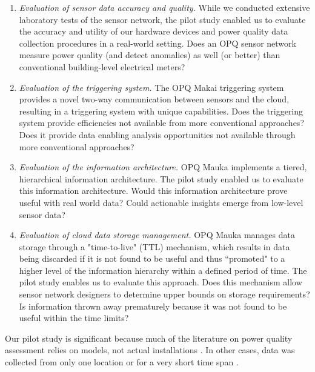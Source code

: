 \begin{enumerate}

\item {\em Evaluation of sensor data accuracy and quality.} While we conducted extensive laboratory tests of the sensor network, the pilot study enabled us to evaluate the accuracy and utility of our hardware devices and power quality data collection procedures in a real-world setting. Does an OPQ sensor network measure power quality (and detect anomalies) as well (or better) than conventional building-level electrical meters?

\item {\em Evaluation of the triggering system.} The OPQ Makai triggering system provides a novel two-way communication between sensors and the cloud, resulting in a triggering system with unique capabilities.  Does the triggering system provide efficiencies not available from more conventional approaches? Does it provide data enabling analysis opportunities not available through more conventional approaches?

\item {\em Evaluation of the information architecture.} OPQ Mauka implements a tiered, hierarchical information architecture.  The pilot study enabled us to evaluate this information architecture.  Would this information architecture prove useful with real world data? Could actionable insights emerge from low-level sensor data?

\item {\em Evaluation of cloud data storage management.} OPQ Mauka manages data storage through a "time-to-live" (TTL) mechanism, which results in data being discarded if it is not found to be useful and thus ``promoted" to a higher level of the information hierarchy within a defined period of time.  The pilot study enables us to evaluate this approach. Does this mechanism allow sensor network designers to determine upper bounds on storage requirements? Is information thrown away prematurely because it was not found to be useful within the time limits?

\end{enumerate}

Our pilot study is significant because much of the literature on power quality assessment relies on models, not actual installations \cite{anurangi_effects_2017,bayindir_effects_2016,farhoodnea_power_2012,shafiullah_experimental_2014}. In other cases, data was collected from only one location or for a very short time span \cite{kucuk_assessment_2013,viciana_openzmeter_2018}.

